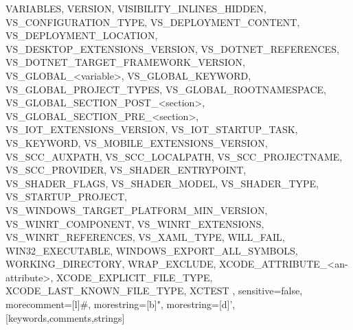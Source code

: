 {{VARIABLES,
VERSION,
VISIBILITY_INLINES_HIDDEN,
VS_CONFIGURATION_TYPE,
VS_DEPLOYMENT_CONTENT,
VS_DEPLOYMENT_LOCATION,
VS_DESKTOP_EXTENSIONS_VERSION,
VS_DOTNET_REFERENCES,
VS_DOTNET_TARGET_FRAMEWORK_VERSION,
VS_GLOBAL_<variable>,
VS_GLOBAL_KEYWORD,
VS_GLOBAL_PROJECT_TYPES,
VS_GLOBAL_ROOTNAMESPACE,
VS_GLOBAL_SECTION_POST_<section>,
VS_GLOBAL_SECTION_PRE_<section>,
VS_IOT_EXTENSIONS_VERSION,
VS_IOT_STARTUP_TASK,
VS_KEYWORD,
VS_MOBILE_EXTENSIONS_VERSION,
VS_SCC_AUXPATH,
VS_SCC_LOCALPATH,
VS_SCC_PROJECTNAME,
VS_SCC_PROVIDER,
VS_SHADER_ENTRYPOINT,
VS_SHADER_FLAGS,
VS_SHADER_MODEL,
VS_SHADER_TYPE,
VS_STARTUP_PROJECT,
VS_WINDOWS_TARGET_PLATFORM_MIN_VERSION,
VS_WINRT_COMPONENT,
VS_WINRT_EXTENSIONS,
VS_WINRT_REFERENCES,
VS_XAML_TYPE,
WILL_FAIL,
WIN32_EXECUTABLE,
WINDOWS_EXPORT_ALL_SYMBOLS,
WORKING_DIRECTORY,
WRAP_EXCLUDE,
XCODE_ATTRIBUTE_<an-attribute>,
XCODE_EXPLICIT_FILE_TYPE,
XCODE_LAST_KNOWN_FILE_TYPE,
XCTEST
        },
	 sensitive=false,
	 morecomment=[l]{\#},
	 morestring=[b]",
	 morestring=[d]',
	}[keywords,comments,strings]
